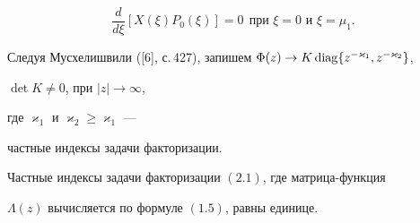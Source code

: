 \begin{equation} 


\frac{d}{d\xi}[X(\xi)P_0(\xi)]=0\ \ 


\text{при $\xi=0$ и $\xi=\mu_1$}.\tag{2.10$''$} 


\end{equation} 


Следуя Мусхелишвили ([6], с.\,427), запишем $\Phi(z)\to 


K\diag\{z^{-\varkappa_1},z^{-\varkappa_2}\}$, 


$\det K\ne0$, при $|z|\to\infty$,


где $\varkappa_1$ и $\varkappa_2\ge\varkappa_1$ --- 


частные индексы задачи факторизации. 


\addtocounter{equation}{1} 


 


\begin{lem} 


Частные индексы задачи факторизации $(2.1)$, где матрица-функция 


$\Lambda(z)$ вычисляется по формуле $(1.5)$, равны единице. 


\end{lem} 


 


